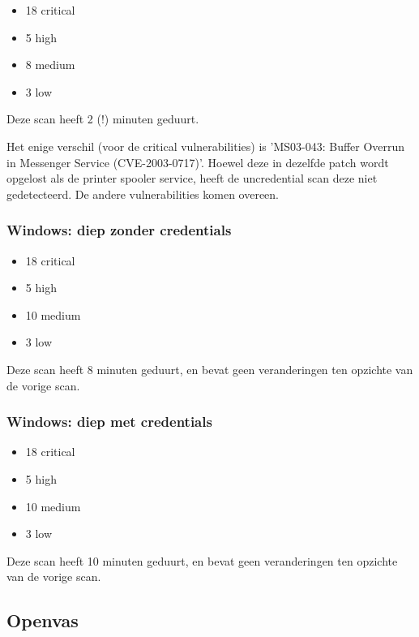 \begin{itemize}
\item 18 critical
\item 5 high
\item 8 medium
\item 3 low
\end{itemize}

Deze scan heeft 2 (!) minuten geduurt.

Het enige verschil (voor de critical vulnerabilities) is 'MS03-043: Buffer Overrun in Messenger Service (CVE-2003-0717)'. Hoewel deze in dezelfde patch wordt opgelost als de printer spooler service, heeft de uncredential scan deze niet gedetecteerd. De andere vulnerabilities komen overeen.

\subsubsection{Windows: diep zonder credentials}

\begin{itemize}
\item 18 critical
\item 5 high
\item 10 medium
\item 3 low
\end{itemize}

Deze scan heeft 8 minuten geduurt, en bevat geen veranderingen ten opzichte van de vorige scan.

\subsubsection{Windows: diep met credentials}

\begin{itemize}
\item 18 critical
\item 5 high
\item 10 medium
\item 3 low
\end{itemize}

Deze scan heeft 10 minuten geduurt, en bevat geen veranderingen ten opzichte van de vorige scan.

\subsection{Openvas}


